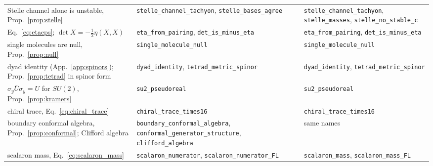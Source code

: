 \documentclass[reprint,aps,prd,amsmath,amssymb,superscriptaddress,nofootinbib,floatfix]{revtex4-2}
\theoremstyle{plain}
\theoremstyle{definition}
\theoremstyle{remark}
\newcommand{\Mol}{\ensuremath{X}}                 %
\newcommand{\SU}{SU(2)}
\begin{document}
\begin{table}[t]
\begin{ruledtabular}
\begin{tabular}{lll}
\parbox[t]{0.36\textwidth}{\raggedright Stelle channel alone is unstable, Prop.~\ref{prop:stelle}\strut} & \parbox[t]{0.30\textwidth}{\raggedright \texttt{stelle\_channel\_tachyon}, \texttt{stelle\_bases\_agree}\strut} & \parbox[t]{0.30\textwidth}{\raggedright \texttt{stelle\_channel\_tachyon}, \texttt{stelle\_masses}, \texttt{stelle\_no\_stable\_c}\strut} \\
\parbox[t]{0.36\textwidth}{\raggedright Eq.~\eqref{eq:etaeps}; $\det\Mol=-\tfrac12\eta(\Mol,\Mol)$\strut} & \parbox[t]{0.30\textwidth}{\raggedright \texttt{eta\_from\_pairing}, \texttt{det\_is\_minus\_eta}\strut} & \parbox[t]{0.30\textwidth}{\raggedright \texttt{eta\_from\_pairing}, \texttt{det\_is\_minus\_eta}\strut} \\
\parbox[t]{0.36\textwidth}{\raggedright single molecules are null, Prop.~\ref{prop:null}\strut} & \parbox[t]{0.30\textwidth}{\raggedright \texttt{single\_molecule\_null}\strut} & \parbox[t]{0.30\textwidth}{\raggedright \texttt{single\_molecule\_null}\strut} \\
\parbox[t]{0.36\textwidth}{\raggedright dyad identity (App.~\ref{app:spinors}); Prop.~\ref{prop:tetrad} in spinor form\strut} & \parbox[t]{0.30\textwidth}{\raggedright \texttt{dyad\_identity}, \texttt{tetrad\_metric\_spinor}\strut} & \parbox[t]{0.30\textwidth}{\raggedright \texttt{dyad\_identity}, \texttt{tetrad\_metric\_spinor}\strut} \\
\parbox[t]{0.36\textwidth}{\raggedright $\sigma_y\bar U\sigma_y=U$ for $\SU$, Prop.~\ref{prop:kramers}\strut} & \parbox[t]{0.30\textwidth}{\raggedright \texttt{su2\_pseudoreal}\strut} & \parbox[t]{0.30\textwidth}{\raggedright \texttt{su2\_pseudoreal}\strut} \\
\parbox[t]{0.36\textwidth}{\raggedright chiral trace, Eq.~\eqref{eq:chiral_trace}\strut} & \parbox[t]{0.30\textwidth}{\raggedright \texttt{chiral\_trace\_times16}\strut} & \parbox[t]{0.30\textwidth}{\raggedright \texttt{chiral\_trace\_times16}\strut} \\
\parbox[t]{0.36\textwidth}{\raggedright boundary conformal algebra, Prop.~\ref{prop:conformal}; Clifford algebra\strut} & \parbox[t]{0.30\textwidth}{\raggedright \texttt{boundary\_conformal\_algebra}, \texttt{conformal\_generator\_structure}, \texttt{clifford\_algebra}\strut} & \parbox[t]{0.30\textwidth}{\raggedright same names\strut} \\
\parbox[t]{0.36\textwidth}{\raggedright scalaron mass, Eq.~\eqref{eq:scalaron_mass}\strut} & \parbox[t]{0.30\textwidth}{\raggedright \texttt{scalaron\_numerator}, \texttt{scalaron\_numerator\_FL}\strut} & \parbox[t]{0.30\textwidth}{\raggedright \texttt{scalaron\_mass}, \texttt{scalaron\_mass\_FL}\strut} \\

\end{tabular}
\end{ruledtabular}
\end{table}
\end{document}
